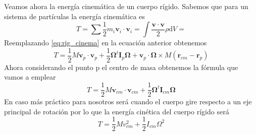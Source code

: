\documentclass[a4paper]{article}
\numberwithin{equation}{section}
\begin{document}
	Veamos ahora la energía cinemática de un cuerpo rígido. Sabemos que para un sistema de partículas la energía cinemática es
	\begin{equation*}
		T = \sum \frac{1}{2} m_i \boldsymbol{v}_i \cdot \boldsymbol{v}_i = \int \frac{\boldsymbol{v} \cdot \boldsymbol{v}}{2} \rho \mathrm{d}V = 
	\end{equation*}
	Reemplazando \ref{eq:rig_cinema} en la ecuación anterior obtenemos
	\begin{equation}
        T = \frac{1}{2} M \boldsymbol{v}_p \cdot \boldsymbol{v}_p + \frac{1}{2} \boldsymbol{\Omega}^t \boldsymbol{I}_p \boldsymbol{\Omega} + \boldsymbol{v}_p \cdot \boldsymbol{\Omega} \times M (\boldsymbol{r}_{cm} - \boldsymbol{r}_p)
	\end{equation}
    Ahora considerando el punto p el centro de masa obtenemos la fórmula que vamos a emplear
    \begin{equation}
        T = \frac{1}{2} M \boldsymbol{v}_{cm} \cdot \boldsymbol{v}_{cm} + \frac{1}{2} \boldsymbol{\Omega}^t \boldsymbol{I}_{cm} \boldsymbol{\Omega}
        \label{eq:t_rigido}
    \end{equation}
    En caso más práctico para nosotros será cuando el cuerpo gire respecto a un eje principal de rotación por lo que la energía cin\'etica del cuerpo rígido será
    \begin{equation}
        T = \frac{1}{2} M v_{cm}^2 + \frac{1}{2} I_{cm} \Omega^2
        \label{eq:t_rigido2}
    \end{equation}
    
\end{document}
